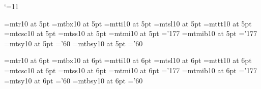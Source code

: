 %
%
%
%

\catcode `\@=11 %

\def\@version{1.4}
\def\@verdate{22nd Feb 1994}


%
%
%
%


\newif\ifprod@font

\ifx\@typeface\undefined
  \def\@typeface{Comp. Modern}\prod@fontfalse
\else
  \prod@fonttrue %
\fi

\def\newfam{\alloc@8\fam\chardef\sixt@@n} %

\ifprod@font
%
\font\fiverm=mtr10 at 5pt
\font\fivebf=mtbx10 at 5pt
\font\fiveit=mtti10 at 5pt
\font\fivesl=mtsl10 at 5pt
\font\fivett=mttt10 at 5pt     \hyphenchar{}
\font\fivecsc=mtcsc10 at 5pt
\font\fivesf=mtss10 at 5pt
\font\fivei=mtmi10 at 5pt      \skewchar\fivei='177
\font\fivemib=mtmib10 at 5pt   \skewchar\fivemib='177
\font\fivesy=mtsy10 at 5pt     \skewchar\fivesy='60
\font\fivesyb=mtbsy10 at 5pt   \skewchar\fivesyb='60

\font\sixrm=mtr10 at 6pt
\font\sixbf=mtbx10 at 6pt
\font\sixit=mtti10 at 6pt
\font\sixsl=mtsl10 at 6pt
\font\sixtt=mttt10 at 6pt      \hyphenchar{}
\font\sixcsc=mtcsc10 at 6pt
\font\sixsf=mtss10 at 6pt
\font\sixi=mtmi10 at 6pt       \skewchar\sixi='177
\font\sixmib=mtmib10 at 6pt    \skewchar\sixmib='177
\font\sixsy=mtsy10 at 6pt      \skewchar\sixsy='60
\font\sixsyb=mtbsy10 at 6pt    \skewchar\sixsyb='60

